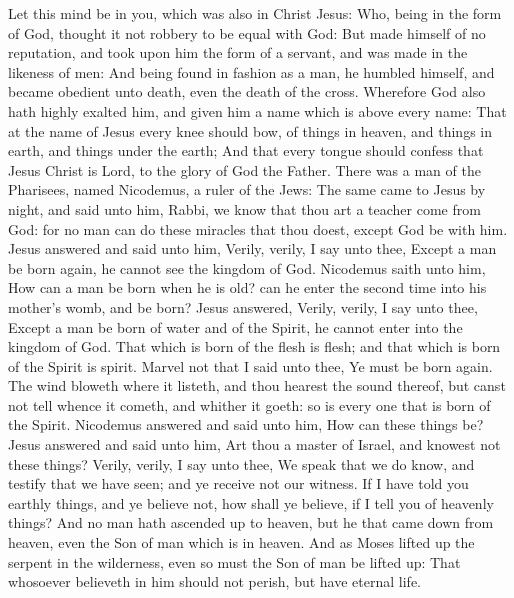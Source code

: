  Let this mind be in you, which was also in Christ Jesus: Who, being in the form of God, thought it not robbery to be equal with God: But made himself of no reputation, and took upon him the form of a servant, and was made in the likeness of men: And being found in fashion as a man, he humbled himself, and became obedient unto death, even the death of the cross. Wherefore God also hath highly exalted him, and given him a name which is above every name: That at the name of Jesus every knee should bow, of things in heaven, and things in earth, and things under the earth; And that every tongue should confess that Jesus Christ is Lord, to the glory of God the Father.
 There was a man of the Pharisees, named Nicodemus, a ruler of the Jews: The same came to Jesus by night, and said unto him, Rabbi, we know that thou art a teacher come from God: for no man can do these miracles that thou doest, except God be with him. Jesus answered and said unto him, Verily, verily, I say unto thee, Except a man be born again, he cannot see the kingdom of God. Nicodemus saith unto him, How can a man be born when he is old? can he enter the second time into his mother's womb, and be born? Jesus answered, Verily, verily, I say unto thee, Except a man be born of water and of the Spirit, he cannot enter into the kingdom of God. That which is born of the flesh is flesh; and that which is born of the Spirit is spirit. Marvel not that I said unto thee, Ye must be born again. The wind bloweth where it listeth, and thou hearest the sound thereof, but canst not tell whence it cometh, and whither it goeth: so is every one that is born of the Spirit. Nicodemus answered and said unto him, How can these things be? Jesus answered and said unto him, Art thou a master of Israel, and knowest not these things? Verily, verily, I say unto thee, We speak that we do know, and testify that we have seen; and ye receive not our witness. If I have told you earthly things, and ye believe not, how shall ye believe, if I tell you of heavenly things? And no man hath ascended up to heaven, but he that came down from heaven, even the Son of man which is in heaven. And as Moses lifted up the serpent in the wilderness, even so must the Son of man be lifted up: That whosoever believeth in him should not perish, but have eternal life.

